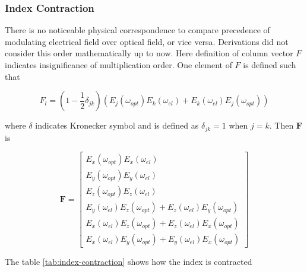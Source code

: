 \documentclass[thesis]{deutez}
\begin{document}


    
    \subsubsection{Index Contraction}

    There is no noticeable physical correspondence to compare precedence of modulating electrical field over optical field, or vice versa. Derivations did not consider this order mathematically up to now. Here definition of column vector $F$ indicates insignificance of multiplication order. One element of $F$ is defined such that

    \begin{equation}
        F_l = (1-\frac{1}{2}\delta_{jk})(E_j(\omega_{opt})E_k(\omega_{el})+E_k(\omega_{el})E_j(\omega_{opt}))
        \label{eq:F}
    \end{equation}

    where $\delta$ indicates Kronecker symbol and is defined as $\delta_{jk}=1$ when $j=k$. Then $\mathbf{F}$ is 

    \begin{equation}
    \mathbf{F=}
    \begin{bmatrix}
        E_x(\omega_{opt})E_x(\omega_{el}) \\
        E_y(\omega_{opt})E_y(\omega_{el}) \\
        E_z(\omega_{opt})E_z(\omega_{el}) \\
        E_y(\omega_{el})E_z(\omega_{opt})+E_z(\omega_{el})E_y(\omega_{opt}) \\
        E_x(\omega_{el})E_z(\omega_{opt})+E_z(\omega_{el})E_x(\omega_{opt}) \\
        E_x(\omega_{el})E_y(\omega_{opt})+E_y(\omega_{el})E_x(\omega_{opt})
    \end{bmatrix}
    \label{eq:F_matrix}
    \end{equation}

    
    
    The table \ref{tab:index-contraction} shows how the index is contracted
\end{document}
